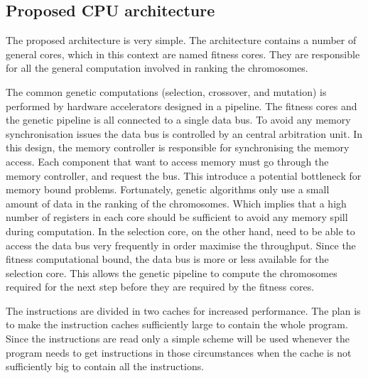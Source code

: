 \subsection {Proposed CPU architecture}

The proposed architecture is very simple.
The architecture contains a number of general cores, which in this context are named fitness cores.
They are responsible for all the general computation involved in ranking the chromosomes.

The common genetic computations (selection, crossover, and mutation) is performed by hardware accelerators designed in a pipeline.
The fitness cores and the genetic pipeline is all connected to a single data bus.
To avoid any memory synchronisation issues the data bus is controlled by an central arbitration unit.
In this design, the memory controller is responsible for synchronising the memory access.
Each component that want to access memory must go through the memory controller, and request the bus.
This introduce a potential bottleneck for memory bound problems.
Fortunately, genetic algorithms only use a small amount of data in the ranking of the chromosomes.
Which implies that a high number of registers in each core should be sufficient to avoid any memory spill during computation.
In the selection core, on the other hand, need to be able to access the data bus very frequently in order maximise the throughput.
Since the fitness computational bound, the data bus is more or less available for the selection core.
This allows the genetic pipeline to compute the chromosomes required for the next step before they are required by the fitness cores. 


The instructions are divided in two caches for increased performance.
The plan is to make the instruction caches sufficiently large to contain the whole program.
Since the instructions are read only a simple scheme will be used whenever the program needs to get instructions in those circumstances when the cache is not sufficiently big to contain all the instructions. 




